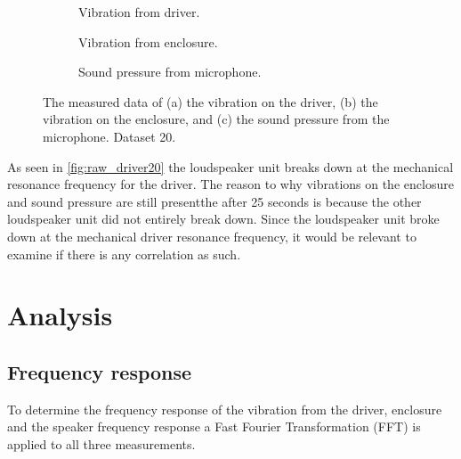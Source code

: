 \begin{figure}[H]
\centering
\begin{subfigure}[t]{0.335\textwidth}
	
	\caption{Vibration from driver.}
	\label{fig:raw_driver20}
\end{subfigure}
\begin{subfigure}[t]{0.3\textwidth}
	
	\caption{Vibration from enclosure.}
	\label{fig:raw_enclosure20}
\end{subfigure}
\begin{subfigure}[t]{0.3\textwidth}
	
	\caption{Sound pressure from microphone.}
	\label{fig:raw_microphone20}
\end{subfigure}
\caption{The measured data of (a) the vibration on the driver, (b) the vibration on the enclosure, and (c) the sound pressure from the microphone. Dataset 20.}
\label{fig:raw20}
\end{figure} 

As seen in \autoref{fig:raw_driver20} the loudspeaker unit breaks down at the mechanical resonance frequency for the driver. The reason to why vibrations on the enclosure and sound pressure are still presentthe  after 25 seconds is because the other loudspeaker unit did not entirely break down. Since the loudspeaker unit broke down at the mechanical driver resonance frequency, it would be relevant to examine if there is any correlation as such.



\section{Analysis}

\subsection{Frequency response}

To determine the frequency response of the vibration from the driver, enclosure and the speaker frequency response a Fast Fourier Transformation (FFT) is applied to all three measurements.

